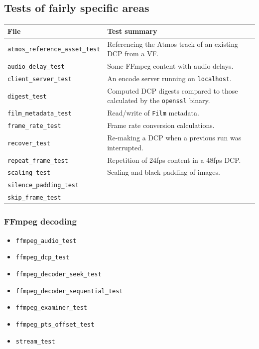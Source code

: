 \documentclass{article}
\newcommand{\co}[1]{\texttt{#1}}
\begin{document}
\subsection{Tests of fairly specific areas}

\begin{tabular}{|l|p{8cm}|}
  \hline
  \textbf{File} & \textbf{Test summary} \\
  \hline
  \co{atmos\_reference\_asset\_test} & Referencing the Atmos track of an existing DCP from a VF. \\
  \hline
  \co{audio\_delay\_test} & Some FFmpeg content with audio delays. \\
  \hline
  \co{client\_server\_test} & An encode server running on \co{localhost}. \\
  \hline
  \co{digest\_test} & Computed DCP digests compared to those calculated by the \co{openssl} binary. \\
  \hline
  \co{film\_metadata\_test} & Read/write of \co{Film} metadata. \\
  \hline
  \co{frame\_rate\_test} & Frame rate conversion calculations. \\
  \hline
  \co{recover\_test} & Re-making a DCP when a previous run was interrupted. \\
  \hline
  \co{repeat\_frame\_test} & Repetition of 24fps content in a 48fps DCP. \\
  \hline
  \co{scaling\_test} & Scaling and black-padding of images. \\
  \hline
  \co{silence\_padding\_test} & \\
  \hline
  \co{skip\_frame\_test} & \\
  \hline
\end{tabular}

\subsubsection{FFmpeg decoding}

\begin{itemize}
\item \co{ffmpeg\_audio\_test}
\item \co{ffmpeg\_dcp\_test}
\item \co{ffmpeg\_decoder\_seek\_test}
\item \co{ffmpeg\_decoder\_sequential\_test}
\item \co{ffmpeg\_examiner\_test}
\item \co{ffmpeg\_pts\_offset\_test}
\item \co{stream\_test}
\end{itemize}
\end{document}
